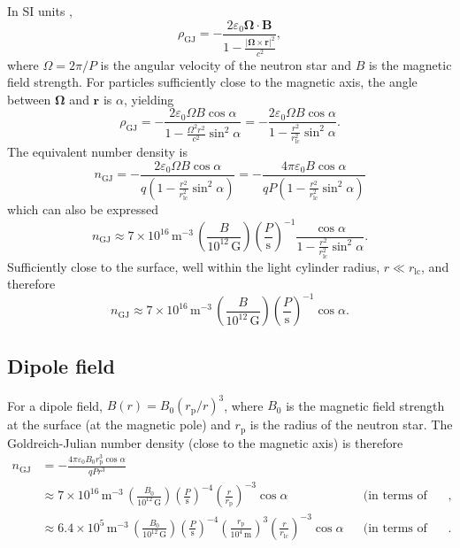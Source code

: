 \documentclass{book}
\newcommand{\rL}{r_\text{lc}} %
\newcommand{\rp}{r_\text{p}} %
\begin{document}
In SI units \citep[e.g.][]{Fung2006},
\begin{equation}
    \rho_\text{GJ} = -\frac{2\varepsilon_0 {\bm \Omega}\cdot{\bm B}}{1 - \frac{|{\bm \Omega}\times{\bm r}|^2}{c^2}},
\end{equation}
where $\Omega = 2\pi/P$ is the angular velocity of the neutron star and $B$ is the magnetic field strength.
For particles sufficiently close to the magnetic axis, the angle between ${\bm \Omega}$ and ${\bm r}$ is $\alpha$, yielding
\begin{equation}
    \rho_\text{GJ}
        = -\frac{2\varepsilon_0 \Omega B \cos\alpha}{1 - \frac{\Omega^2 r^2}{c^2}\sin^2\alpha}
        = -\frac{2\varepsilon_0 \Omega B \cos\alpha}{1 - \frac{r^2}{\rL^2}\sin^2\alpha}.
\end{equation}
The equivalent number density is
\begin{equation}
    n_\text{GJ}
        = -\frac{2\varepsilon_0 \Omega B \cos\alpha}{q\left(1 - \frac{r^2}{\rL^2}\sin^2\alpha\right)}
        = -\frac{4\pi\varepsilon_0 B \cos\alpha}{qP\left(1 - \frac{r^2}{\rL^2}\sin^2\alpha\right)}
\end{equation}
which can also be expressed
\begin{equation}
    n_\text{GJ} \approx 7 \times 10^{16}\,\text{m}^{-3} \, \left(\frac{B}{10^{12}\,\text{G}}\right) \left(\frac{P}{\text{s}}\right)^{-1} \frac{\cos\alpha}{1 - \frac{r^2}{\rL^2}\sin^2\alpha}.
\end{equation}
Sufficiently close to the surface, well within the light cylinder radius, $r \ll \rL$, and therefore
\begin{equation}
    n_\text{GJ} \approx 7 \times 10^{16}\,\text{m}^{-3} \, \left(\frac{B}{10^{12}\,\text{G}}\right) \left(\frac{P}{\text{s}}\right)^{-1} \cos\alpha.
\end{equation}

\subsection{Dipole field}

For a dipole field, $B(r) = B_0 (\rp/r)^3$, where $B_0$ is the magnetic field strength at the surface (at the magnetic pole) and $\rp$ is the radius of the neutron star.
The Goldreich-Julian number density (close to the magnetic axis) is therefore
\begin{equation}
    \begin{aligned}
    n_\text{GJ}
        &= -\frac{4\pi\varepsilon_0 B_0 \rp^3 \cos\alpha}{qPr^3} \\
        &\approx 7 \times 10^{16}\,\text{m}^{-3} \, \left(\frac{B_0}{10^{12}\,\text{G}}\right) \left(\frac{P}{\text{s}}\right)^{-4} \left(\frac{r}{\rp}\right)^{-3} \cos\alpha & & \text{(in terms of the stellar radius)}, \\
        &\approx 6.4 \times 10^5\,\text{m}^{-3} \, \left(\frac{B_0}{10^{12}\,\text{G}}\right) \left(\frac{P}{\text{s}}\right)^{-4} \left(\frac{\rp}{10^4\,\text{m}}\right)^3 \left(\frac{r}{\rL}\right)^{-3} \cos\alpha & & \text{(in terms of the light cylinder radius)}.
    \end{aligned}
\end{equation}
\end{document}
